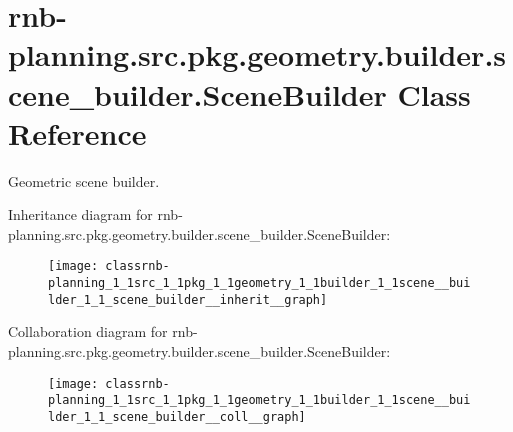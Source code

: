 \hypertarget{classrnb-planning_1_1src_1_1pkg_1_1geometry_1_1builder_1_1scene__builder_1_1_scene_builder}{}\section{rnb-\/planning.src.\+pkg.\+geometry.\+builder.\+scene\+\_\+builder.\+Scene\+Builder Class Reference}
\label{classrnb-planning_1_1src_1_1pkg_1_1geometry_1_1builder_1_1scene__builder_1_1_scene_builder}


Geometric scene builder.  




Inheritance diagram for rnb-\/planning.src.\+pkg.\+geometry.\+builder.\+scene\+\_\+builder.\+Scene\+Builder\+:\nopagebreak
\begin{figure}[H]
\begin{center}
\leavevmode
\texttt{[image: classrnb-planning\_1\_1src\_1\_1pkg\_1\_1geometry\_1\_1builder\_1\_1scene\_\_builder\_1\_1\_scene\_builder\_\_inherit\_\_graph]}
\end{center}
\end{figure}


Collaboration diagram for rnb-\/planning.src.\+pkg.\+geometry.\+builder.\+scene\+\_\+builder.\+Scene\+Builder\+:\nopagebreak
\begin{figure}[H]
\begin{center}
\leavevmode
\texttt{[image: classrnb-planning\_1\_1src\_1\_1pkg\_1\_1geometry\_1\_1builder\_1\_1scene\_\_builder\_1\_1\_scene\_builder\_\_coll\_\_graph]}
\end{center}
\end{figure}
